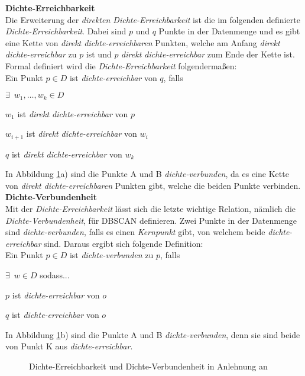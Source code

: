 \documentclass{lni}
\newcommand{\SubItem}[1]{
    {\setlength\itemindent{15pt} \item[-] #1}
}
\begin{document}
\begin{minipage}{\textwidth}

\textbf{Dichte-Erreichbarkeit}\\
Die Erweiterung der \textit{direkten Dichte-Erreichbarkeit} ist die im folgenden definierte \textit{Dichte-Erreichbarkeit}. Dabei sind $p$ und $q$ Punkte in der Datenmenge und es gibt eine Kette von \textit{direkt dichte-erreichbaren} Punkten, welche am Anfang \textit{direkt dichte-erreichbar} zu $p$ ist und $p$ \textit{direkt dichte-erreichbar} zum Ende der Kette ist. Formal definiert wird die \textit{Dichte-Erreichbarkeit} folgendermaßen:\\
Ein Punkt $ p \in D $ ist \textit{dichte-erreichbar} von $q$, falls
\begin{itemize}
    \item $\exists\enspace w_1,\dots,w_k \in D$
        \SubItem{$w_1$ ist \textit{direkt dichte-erreichbar} von $p$}
        \SubItem{$w_{i+1}$ ist \textit{direkt dichte-erreichbar} von $w_i$}
        \SubItem{$q$ ist \textit{direkt dichte-erreichbar} von $w_k$}
\end{itemize}
In Abbildung \ref{fig:2}a) sind die Punkte A und B \textit{dichte-verbunden}, da es eine Kette von \textit{direkt dichte-erreichbaren} Punkten gibt, welche die beiden Punkte verbinden.\\


\textbf{Dichte-Verbundenheit}\\
Mit der \textit{Dichte-Erreichbarkeit} lässt sich die letzte wichtige Relation, nämlich die \textit{Dichte-Verbundenheit}, für DBSCAN definieren. Zwei Punkte in der Datenmenge sind \textit{dichte-verbunden}, falls es einen \textit{Kernpunkt} gibt, von welchem beide \textit{dichte-erreichbar} sind. Daraus ergibt sich folgende Definition:\\
Ein Punkt $ p \in D $ ist \textit{dichte-verbunden} zu $p$, falls
\begin{itemize}
    \item $\exists\enspace w \in D$ sodass...
        \SubItem{ $p$ ist \textit{dichte-erreichbar} von $o$}
        \SubItem{ $q$ ist \textit{dichte-erreichbar} von $o$}
\end{itemize}
In Abbildung \ref{fig:2}b) sind die Punkte A und B \textit{dichte-verbunden}, denn sie sind beide von Punkt K aus \textit{dichte-erreichbar}.


\begin{figure}[H]
    \centering
    \subfloat[]{{}}%
    \qquad
    \subfloat[]{{}}
    \caption{Dichte-Erreichbarkeit und Dichte-Verbundenheit in Anlehnung an \cite{SKRIPT}}%
    \label{fig:2}%
\end{figure}

\end{minipage}
\end{document}
